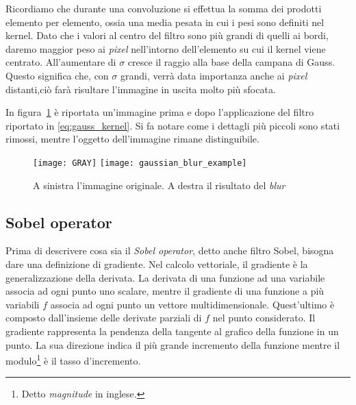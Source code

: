Ricordiamo che durante una convoluzione si effettua la somma dei prodotti elemento per elemento, ossia una media pesata in cui i pesi sono definiti nel kernel.
Dato che i valori al centro del filtro sono più grandi di quelli ai bordi, daremo maggior peso ai \textit{pixel} nell'intorno dell'elemento su cui il kernel viene centrato.
All'aumentare di $\sigma$ cresce il raggio alla base della campana di Gauss.
Questo significa che, con $\sigma$ grandi, verrà data importanza anche ai \textit{pixel} distanti,ciò farà risultare l'immagine in uscita molto più sfocata.

In figura~\ref{fig:gaussian_blur_example} è riportata un'immagine prima e dopo l'applicazione del filtro riportato in \ref{eq:gauss_kernel}.
Si fa notare come i dettagli più piccoli sono stati rimossi, mentre l'oggetto dell'immagine rimane distinguibile.

\begin{figure}[ht] %
  \begin{center}
    \texttt{[image: GRAY]}
    \texttt{[image: gaussian\_blur\_example]}
    \caption{A sinistra l'immagine originale. A destra il risultato del \textit{blur}}
    \label{fig:gaussian_blur_example}
  \end{center}
\end{figure}





\subsection {Sobel operator}
Prima di descrivere cosa sia il \textit{Sobel operator}, detto anche filtro Sobel, bisogna dare una definizione di gradiente.
Nel calcolo vettoriale, il gradiente è la generalizzazione della derivata.
La derivata di una funzione ad una variabile associa ad ogni punto uno scalare, mentre il gradiente di una funzione a più variabili $f$ associa ad ogni punto un vettore multidimensionale.
Quest'ultimo è composto dall'insieme delle derivate parziali di $f$ nel punto considerato.
Il gradiente rappresenta la pendenza della tangente al grafico della funzione in un punto.
La sua direzione indica il più grande incremento della funzione mentre il modulo\footnote{Detto \textit{magnitude} in inglese.} è il tasso d'incremento.

